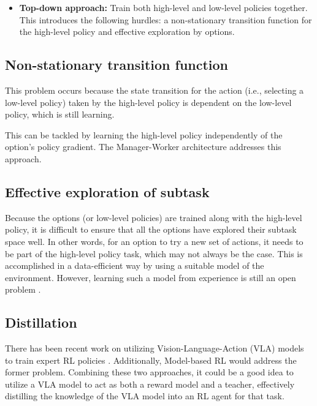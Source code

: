 \begin{itemize}
\item \textbf{Top-down approach:}
Train both high-level and low-level policies together. This introduces the following hurdles: a non-stationary transition function for the high-level policy and effective exploration by options. 
\end{itemize}

\subsection{Non-stationary transition function}
This problem occurs because the state transition for the action (i.e., selecting a low-level policy) taken by the high-level policy is dependent on the low-level policy, which is still learning.

This can be tackled by learning the high-level policy independently of the option's policy gradient. 
The Manager-Worker architecture \cite{vezhnevetsFeUdalNetworksHierarchical2017} addresses this approach.

\subsection{Effective exploration of subtask}
Because the options (or low-level policies) are trained along with the high-level policy, it is difficult to ensure that all the options have explored their subtask space well. 
In other words, for an option to try a new set of actions, it needs to be part of the high-level policy task, which may not always be the case. 
This is accomplished in a data-efficient way by using a suitable model of the environment. 
However, learning such a model from experience is still an open problem \cite{hutsebaut-buysseHierarchicalReinforcementLearning2022}.

\subsection{Distillation}
There has been recent work on utilizing Vision-Language-Action (VLA) models to train expert RL policies \cite{xiangVLAModelExpertCollaboration2025}. 
Additionally, Model-based RL would address the former problem. 
Combining these two approaches, it could be a good idea to utilize a VLA model to act as both a reward model and a teacher, effectively distilling the knowledge of the VLA model into an RL agent for that task.